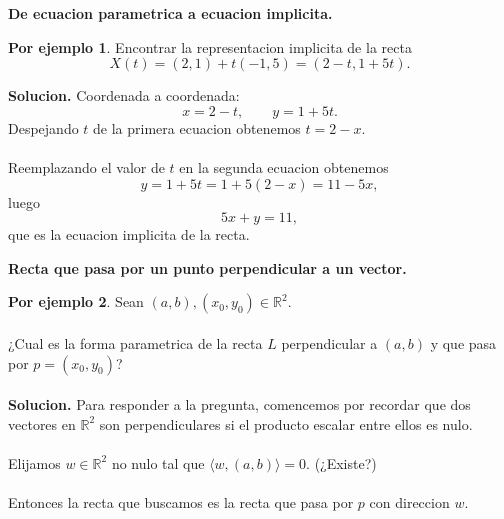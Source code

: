 \documentclass{article}
\theoremstyle{definition}
\theoremstyle{definition}
\newtheorem*{ej}{Por ejemplo}
\theoremstyle{remark}
\begin{document}
\begin{center}
\textbf{De ecuacion parametrica a ecuacion implicita.}
\end{center}
\begin{ej}
  Encontrar la representacion implicita de la recta \[
X(t)=(2,1)+t(-1,5)=(2-t,1+5t).
  \]
\end{ej}
\textbf{Solucion.} Coordenada a coordenada: \[
x=2-t, \quad \quad y=1+5t.
\]
Despejando $t$ de la primera ecuacion obtenemos $t=2-x$.
\\\\
Reemplazando el valor de $t$ en la segunda ecuacion obtenemos \[
y=1+5t=1+5(2-x)=11-5x,
\]
luego
\[
5x+y=11,
\]
que es la ecuacion implicita de la recta.
\begin{center}
\textbf{Recta que pasa por un punto perpendicular a un vector.}
\end{center}
\begin{ej}
  Sean $(a,b),(x_0,y_0) \in \mathbb{R}^2$.\\\\ 
  ¿Cual es la forma parametrica de la recta $L$ perpendicular a $(a,b)$ y que pasa por $p=(x_0,y_0)$?\\\\
\textbf{Solucion.} Para responder a la pregunta, comencemos por recordar que dos vectores en $\mathbb{R}^2$ son perpendiculares si el producto escalar entre ellos es nulo.\\\\
Elijamos $w\in\mathbb{R}^2$ no nulo tal que $\big\langle w,(a,b)\big\rangle=0$. (¿Existe?)\\\\
Entonces la recta que buscamos es la recta que pasa por $p$ con direccion $w$.
\end{ej}
\begin{figure}[h]
\centering
\def\svgwidth{0.55\textwidth}

\end{figure}
\end{document}
